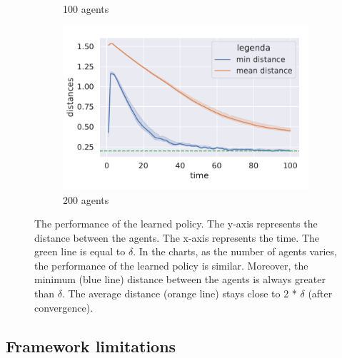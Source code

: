 \documentclass[12pt,a4paper,openright,twoside]{book}
\begin{document}
\begin{figure}[h!]
\begin{subfigure}[b]{0.32\textwidth}
            \caption{100 agents}
        \end{subfigure}
        \hfill
        \begin{subfigure}[b]{0.32\textwidth}
            \centering
            \includegraphics[width=\textwidth]{figures/data-200.pdf}
            \caption{200 agents}
        \end{subfigure}
    \caption{The performance of the learned policy. 
    The y-axis represents the distance between the agents.
    The x-axis represents the time.
    The green line is equal to $\delta$.
    In the charts, as the number of agents varies, the performance of the learned policy is similar.
    Moreover, the minimum (blue line) distance between the agents is always greater than $\delta$.
    The average distance (orange line) stays close to 2 * $\delta$ (after convergence).
    }
    \label{fig:test}
    \end{figure}


\section{Framework limitations}

\chapter{\conclusionsname}
\label{chap:conclusions}





\end{document}
